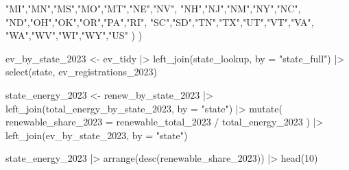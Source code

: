 \documentclass[
  letterpaper,
  DIV=11,
  numbers=noendperiod]{scrartcl}
\newenvironment{Shaded}{\begin{snugshade}}{\end{snugshade}}
\newcommand{\AttributeTok}[1]{\textcolor[rgb]{0.40,0.45,0.13}{#1}}
\newcommand{\DecValTok}[1]{\textcolor[rgb]{0.68,0.00,0.00}{#1}}
\newcommand{\FunctionTok}[1]{\textcolor[rgb]{0.28,0.35,0.67}{#1}}
\newcommand{\NormalTok}[1]{\textcolor[rgb]{0.00,0.23,0.31}{#1}}
\newcommand{\OtherTok}[1]{\textcolor[rgb]{0.00,0.23,0.31}{#1}}
\newcommand{\SpecialCharTok}[1]{\textcolor[rgb]{0.37,0.37,0.37}{#1}}
\newcommand{\StringTok}[1]{\textcolor[rgb]{0.13,0.47,0.30}{#1}}
\begin{document}
\begin{Shaded}
\begin{Highlighting}[]
    \StringTok{"MI"}\NormalTok{,}\StringTok{"MN"}\NormalTok{,}\StringTok{"MS"}\NormalTok{,}\StringTok{"MO"}\NormalTok{,}\StringTok{"MT"}\NormalTok{,}\StringTok{"NE"}\NormalTok{,}\StringTok{"NV"}\NormalTok{,}
    \StringTok{"NH"}\NormalTok{,}\StringTok{"NJ"}\NormalTok{,}\StringTok{"NM"}\NormalTok{,}\StringTok{"NY"}\NormalTok{,}\StringTok{"NC"}\NormalTok{,}
    \StringTok{"ND"}\NormalTok{,}\StringTok{"OH"}\NormalTok{,}\StringTok{"OK"}\NormalTok{,}\StringTok{"OR"}\NormalTok{,}\StringTok{"PA"}\NormalTok{,}\StringTok{"RI"}\NormalTok{,}
    \StringTok{"SC"}\NormalTok{,}\StringTok{"SD"}\NormalTok{,}\StringTok{"TN"}\NormalTok{,}\StringTok{"TX"}\NormalTok{,}\StringTok{"UT"}\NormalTok{,}\StringTok{"VT"}\NormalTok{,}\StringTok{"VA"}\NormalTok{,}
    \StringTok{"WA"}\NormalTok{,}\StringTok{"WV"}\NormalTok{,}\StringTok{"WI"}\NormalTok{,}\StringTok{"WY"}\NormalTok{,}\StringTok{"US"}
\NormalTok{  )}
\NormalTok{)}

\NormalTok{ev\_by\_state\_2023 }\OtherTok{\textless{}{-}}
\NormalTok{  ev\_tidy }\SpecialCharTok{|\textgreater{}}
  \FunctionTok{left\_join}\NormalTok{(state\_lookup, }\AttributeTok{by =} \StringTok{"state\_full"}\NormalTok{) }\SpecialCharTok{|\textgreater{}}
  \FunctionTok{select}\NormalTok{(state, ev\_registrations\_2023)}

\NormalTok{state\_energy\_2023 }\OtherTok{\textless{}{-}}
\NormalTok{  renew\_by\_state\_2023 }\SpecialCharTok{|\textgreater{}}
  \FunctionTok{left\_join}\NormalTok{(total\_energy\_by\_state\_2023, }\AttributeTok{by =} \StringTok{"state"}\NormalTok{) }\SpecialCharTok{|\textgreater{}}
  \FunctionTok{mutate}\NormalTok{(}
    \AttributeTok{renewable\_share\_2023 =}\NormalTok{ renewable\_total\_2023 }\SpecialCharTok{/}\NormalTok{ total\_energy\_2023}
\NormalTok{  ) }\SpecialCharTok{|\textgreater{}}
  \FunctionTok{left\_join}\NormalTok{(ev\_by\_state\_2023, }\AttributeTok{by =} \StringTok{"state"}\NormalTok{)}

\NormalTok{state\_energy\_2023 }\SpecialCharTok{|\textgreater{}}
  \FunctionTok{arrange}\NormalTok{(}\FunctionTok{desc}\NormalTok{(renewable\_share\_2023)) }\SpecialCharTok{|\textgreater{}}
  \FunctionTok{head}\NormalTok{(}\DecValTok{10}\NormalTok{)}
\end{Highlighting}
\end{Shaded}
\end{document}
